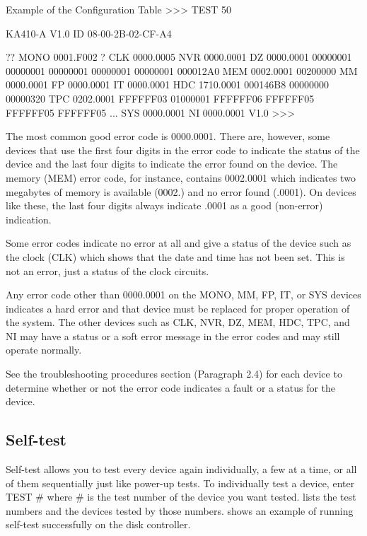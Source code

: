 \begin{ttfig}{Example of the Configuration Table}
>>> TEST 50

KA410-A V1.0
ID 08-00-2B-02-CF-A4

?? MONO       0001.F002
 ? CLK        0000.0005
   NVR        0000.0001
   DZ         0000.0001
       00000001 00000001 00000001 00000001 00000001 000012A0
   MEM        0002.0001
       00200000
   MM         0000.0001
   FP         0000.0001
   IT         0000.0001
   HDC        1710.0001
       000146B8 00000000 00000320
   TPC        0202.0001
       FFFFFF03 01000001 FFFFFF06 FFFFFF05 FFFFFF05 FFFFFF05 ...
   SYS        0000.0001
   NI         0000.0001 V1.0
>>>
\end{ttfig}
\newpage
The most common good error code is 0000.0001. There are, however, some
devices that use the first four digits in the error code to indicate the status
of the device and the last four digits to indicate the error found on the
device. The memory (MEM) error code, for instance, contains 0002.0001
which indicates two megabytes of memory is available (0002.) and no error
found (.0001). On devices like these, the last four digits always indicate
.0001 as a good (non-error) indication.

Some error codes indicate no error at all and give a status of the device
such as the clock (CLK) which shows that the date and time has not been
set. This is not an error, just a status of the clock circuits.

Any error code other than 0000.0001 on the MONO, MM, FP, IT, or SYS
devices indicates a hard error and that device must be replaced for proper
operation of the system. The other devices such as CLK, NVR, DZ, MEM,
HDC, TPC, and NI may have a status or a soft error message in the error
codes and may still operate normally.

See the troubleshooting procedures section (Paragraph 2.4) for each device
to determine whether or not the error code indicates a fault or a status for
the device.

\subsection{Self-test}

Self-test allows you to test every device again individually, a few at a time,
or all of them sequentially just like power-up tests. To individually test a
device, enter TEST \# where \# is the test number of the device you want
tested.  lists the test numbers and the devices tested by those
numbers.  shows an example of running self-test successfully on
the disk controller.

